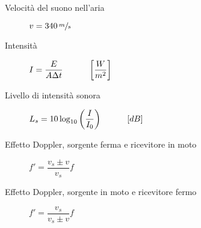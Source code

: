 \documentclass[a4paper,11pt,italian]{article}
\begin{document}
\begin{description}
%
  \item[Velocità del suono nell'aria] $ v = 340 \, \sfrac{m}{s} $


  \item[Intensità]$ I = \dfrac{E}{A \Delta t} \hspace*{3em} \left[ \dfrac{W}{m^2} \right]$

%
%
  \item[Livello di intensità sonora]$L_s = 10 \log_{10} \left(\dfrac{I}{I_0}\right) \hspace*{3em} [dB] $
%   
%
  
  \item[Effetto Doppler, sorgente ferma e ricevitore in moto] $ f' = \dfrac{v_s \pm  v}{v_s}f $
%   
  
  \item[Effetto Doppler, sorgente in moto e ricevitore fermo] $ f' = \dfrac{v_s }{v_s \pm  v}f $
\end{description}
\end{document}
